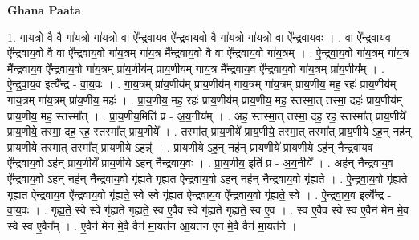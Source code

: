 \documentclass[17pt]{extarticle}
\begin{document}
\textbf{Ghana Paata } \newline

1. गा॒य॒त्रो वै वै गा॑य॒त्रो गा॑य॒त्रो वा ऐ᳚न्द्रवाय॒व ऐ᳚न्द्रवाय॒वो वै गा॑य॒त्रो गा॑य॒त्रो वा ऐ᳚न्द्रवाय॒वः । . वा ऐ᳚न्द्रवाय॒व ऐ᳚न्द्रवाय॒वो वै वा ऐ᳚न्द्रवाय॒वो गा॑य॒त्रम् गा॑य॒त्र मै᳚न्द्रवाय॒वो वै वा ऐ᳚न्द्रवाय॒वो गा॑य॒त्रम् । . ऐ॒न्द्र॒वा॒य॒वो गा॑य॒त्रम् गा॑य॒त्र मै᳚न्द्रवाय॒व ऐ᳚न्द्रवाय॒वो गा॑य॒त्रम् प्रा॑य॒णीय॑म् प्राय॒णीय॑म् गाय॒त्र मै᳚न्द्रवाय॒व ऐ᳚न्द्रवाय॒वो गा॑य॒त्रम् प्रा॑य॒णीय᳚म् । . ऐ॒न्द्र॒वा॒य॒व इत्यै᳚न्द्र - वा॒य॒वः । . गा॒य॒त्रम् प्रा॑य॒णीय॑म् प्राय॒णीय॑म् गाय॒त्रम् गा॑य॒त्रम् प्रा॑य॒णीय॒ मह॒ रहः॑ प्राय॒णीय॑म् गाय॒त्रम् गा॑य॒त्रम् प्रा॑य॒णीय॒ महः॑ । . प्रा॒य॒णीय॒ मह॒ रहः॑ प्राय॒णीय॑म् प्राय॒णीय॒ मह॒ स्तस्मा॒त् तस्मा॒ दहः॑ प्राय॒णीय॑म् प्राय॒णीय॒ मह॒ स्तस्मा᳚त् । . प्रा॒य॒णीय॒मिति॑ प्र - अ॒य॒नीय᳚म् । . अह॒ स्तस्मा॒त् तस्मा॒ दह॒ रह॒ स्तस्मा᳚त् प्राय॒णीये᳚ प्राय॒णीये॒ तस्मा॒ दह॒ रह॒ स्तस्मा᳚त् प्राय॒णीये᳚ । . तस्मा᳚त् प्राय॒णीये᳚ प्राय॒णीये॒ तस्मा॒त् तस्मा᳚त् प्राय॒णीये ऽह॒न् नह॑न् प्राय॒णीये॒ तस्मा॒त् तस्मा᳚त् प्राय॒णीये ऽहन्न्॑ । . प्रा॒य॒णीये ऽह॒न् नह॑न् प्राय॒णीये᳚ प्राय॒णीये ऽह॑न् नैन्द्रवाय॒व ऐ᳚न्द्रवाय॒वो ऽह॑न् प्राय॒णीये᳚ प्राय॒णीये ऽह॑न् नैन्द्रवाय॒वः । . प्रा॒य॒णीय॒ इति॑ प्र - अ॒य॒नीये᳚ । . अह॑न् नैन्द्रवाय॒व ऐ᳚न्द्रवाय॒वो ऽह॒न् नह॑न् नैन्द्रवाय॒वो गृ॑ह्यते गृह्यत ऐन्द्रवाय॒वो ऽह॒न् नह॑न् नैन्द्रवाय॒वो गृ॑ह्यते । . ऐ॒न्द्र॒वा॒य॒वो गृ॑ह्यते गृह्यत ऐन्द्रवाय॒व ऐ᳚न्द्रवाय॒वो गृ॑ह्यते॒ स्वे स्वे गृ॑ह्यत ऐन्द्रवाय॒व ऐ᳚न्द्रवाय॒वो गृ॑ह्यते॒ स्वे । . ऐ॒न्द्र॒वा॒य॒व इत्यै᳚न्द्र - वा॒य॒वः । . गृ॒ह्य॒ते॒ स्वे स्वे गृ॑ह्यते गृह्यते॒ स्व ए॒वैव स्वे गृ॑ह्यते गृह्यते॒ स्व ए॒व । . स्व ए॒वैव स्वे स्व ए॒वैन॑ मेन मे॒व स्वे स्व ए॒वैन᳚म् । . ए॒वैन॑ मेन मे॒वै वैन॑ मा॒यत॑न आ॒यत॑न एन मे॒वै वैन॑ मा॒यत॑ने । \newline
\end{document}

